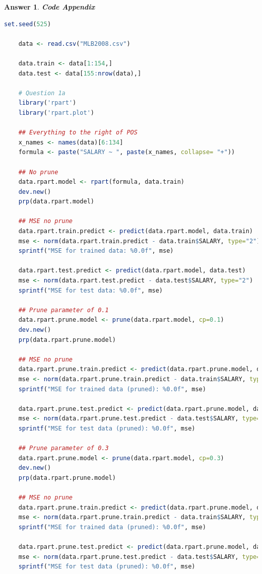 \documentclass[12pt]{article}
\theoremstyle{colon}
\newtheorem*{answer}{Answer}
\begin{document}
\begin{answer}
  \textbf{Code Appendix}

  \begin{lstlisting}[language=R, basicstyle=\scriptsize, breaklines=true]
    set.seed(525)

    data <- read.csv("MLB2008.csv")

    data.train <- data[1:154,]
    data.test <- data[155:nrow(data),]

    # Question 1a
    library('rpart')
    library('rpart.plot')

    ## Everything to the right of POS
    x_names <- names(data)[6:134]
    formula <- paste("SALARY ~ ", paste(x_names, collapse= "+"))

    ## No prune
    data.rpart.model <- rpart(formula, data.train)
    dev.new()
    prp(data.rpart.model)

    ## MSE no prune
    data.rpart.train.predict <- predict(data.rpart.model, data.train)
    mse <- norm(data.rpart.train.predict - data.train$SALARY, type="2")
    sprintf("MSE for trained data: %0.0f", mse)

    data.rpart.test.predict <- predict(data.rpart.model, data.test)
    mse <- norm(data.rpart.test.predict - data.test$SALARY, type="2")
    sprintf("MSE for test data: %0.0f", mse)

    ## Prune parameter of 0.1
    data.rpart.prune.model <- prune(data.rpart.model, cp=0.1)
    dev.new()
    prp(data.rpart.prune.model)

    ## MSE no prune
    data.rpart.prune.train.predict <- predict(data.rpart.prune.model, data.train)
    mse <- norm(data.rpart.prune.train.predict - data.train$SALARY, type="2")
    sprintf("MSE for trained data (pruned): %0.0f", mse)

    data.rpart.prune.test.predict <- predict(data.rpart.prune.model, data.test)
    mse <- norm(data.rpart.prune.test.predict - data.test$SALARY, type="2")
    sprintf("MSE for test data (pruned): %0.0f", mse)

    ## Prune parameter of 0.3
    data.rpart.prune.model <- prune(data.rpart.model, cp=0.3)
    dev.new()
    prp(data.rpart.prune.model)

    ## MSE no prune
    data.rpart.prune.train.predict <- predict(data.rpart.prune.model, data.train)
    mse <- norm(data.rpart.prune.train.predict - data.train$SALARY, type="2")
    sprintf("MSE for trained data (pruned): %0.0f", mse)

    data.rpart.prune.test.predict <- predict(data.rpart.prune.model, data.test)
    mse <- norm(data.rpart.prune.test.predict - data.test$SALARY, type="2")
    sprintf("MSE for test data (pruned): %0.0f", mse)


\end{lstlisting}
\end{answer}
\end{document}
